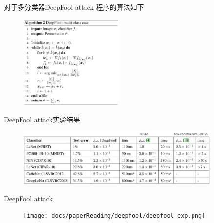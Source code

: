 \begin{frame}{对于多分类器DeepFool attack}
    程序的算法如下
    \begin{figure}
        \centering
        \includegraphics[width=0.46\textwidth]{docs/paperReading/deepfool/deepfool-algorithm_2.png}
    \end{figure}
\end{frame}
\begin{frame}{DeepFool attack实验结果}
    \begin{figure}
        \centering
        \includegraphics[width=0.9\textwidth]{docs/paperReading/deepfool/deepfool-result_1.png}
    \end{figure}
\end{frame}

\begin{frame}{DeepFool attack}
    \begin{figure}
        \centering
        \texttt{[image: docs/paperReading/deepfool/deepfool-exp.png]}
    \end{figure}
\end{frame}